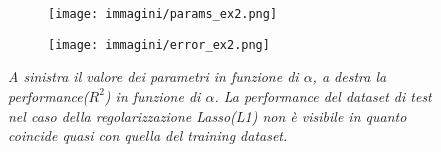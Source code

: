 \documentclass{article}
\begin{document}
\begin{figure}[H]
    \centering
    \begin{subfigure}{.49\textwidth}
       \centering
       \texttt{[image: immagini/params\_ex2.png]}
    \end{subfigure}
    \begin{subfigure}{.49\textwidth}
       \centering
       \texttt{[image: immagini/error\_ex2.png]}
   \end{subfigure} 
   \caption{\emph{A sinistra il valore dei parametri in funzione di $\alpha$, a destra la performance($R^2$) in funzione di $\alpha$. La performance del dataset di test nel caso della regolarizzazione Lasso(L1) non è visibile in quanto coincide quasi con quella del training dataset.}}
   \label{fig:performance_ex2}
\end{figure}
\end{document}
